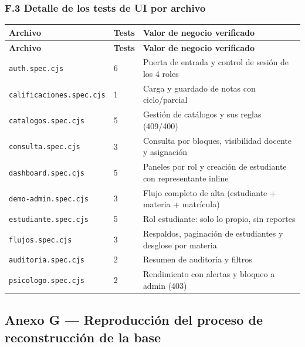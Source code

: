 \documentclass[11pt,a4paper]{article}
\begin{document}
\subsubsection*{F.3 Detalle de los tests de UI por archivo}


{\small
\begin{longtable}{|p{}|p{}|p{}|}
\rowcolor{UTECblue}\color{white}\bfseries Archivo & \color{white}\bfseries Tests & \color{white}\bfseries Valor de negocio verificado \\ \hline
\endfirsthead
\rowcolor{UTECblue}\color{white}\bfseries Archivo & \color{white}\bfseries Tests & \color{white}\bfseries Valor de negocio verificado \\ \hline
\endhead
\texttt{auth.spec.cjs} & 6 & Puerta de entrada y control de sesión de los 4 roles \\ \hline
\texttt{calificaciones.spec.cjs} & 1 & Carga y guardado de notas con ciclo/parcial \\ \hline
\texttt{catalogos.spec.cjs} & 5 & Gestión de catálogos y sus reglas (409/400) \\ \hline
\texttt{consulta.spec.cjs} & 3 & Consulta por bloques, visibilidad docente y asignación \\ \hline
\texttt{dashboard.spec.cjs} & 5 & Paneles por rol y creación de estudiante con representante inline \\ \hline
\texttt{demo-admin.spec.cjs} & 3 & Flujo completo de alta (estudiante + materia + matrícula) \\ \hline
\texttt{estudiante.spec.cjs} & 5 & Rol estudiante: solo lo propio, sin reportes \\ \hline
\texttt{flujos.spec.cjs} & 3 & Respaldos, paginación de estudiantes y desglose por materia \\ \hline
\texttt{auditoria.spec.cjs} & 2 & Resumen de auditoría y filtros \\ \hline
\texttt{psicologo.spec.cjs} & 2 & Rendimiento con alertas y bloqueo a admin (403) \\ \hline
\end{longtable}}


\subsection*{Anexo G --- Reproducción del proceso de reconstrucción de la base}
\end{document}

